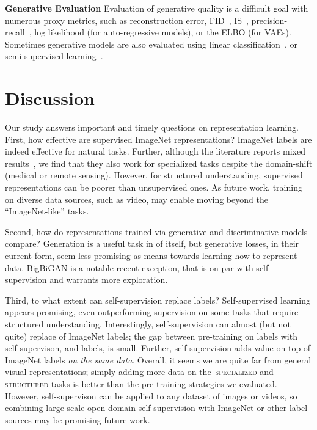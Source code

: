 \documentclass{article}
\newcommand{\myparagraph}[1]{\noindent\textbf{#1}\quad}
\DeclareRobustCommand{\taskSpecialized}{\raisebox{0.5pt}{\tikz{\fill[specialized] (0,0) circle (.5ex);}}\,\textsc{specialized}}
\DeclareRobustCommand{\taskStructured}{\raisebox{0.5pt}{\tikz{\fill[structured] (0,0) circle (.5ex);}}\,\textsc{structured}}
\newcommand{\imagenet}{ImageNet}
\begin{document}
\myparagraph{Generative Evaluation}
Evaluation of generative quality is a difficult goal with numerous proxy metrics, such as reconstruction error, FID~\citep{heusel2017gans}, IS~\citep{salimans2016improved}, precision-recall~\citep{sajjadi2018assessing}, log likelihood (for auto-regressive models), or the ELBO (for VAEs).
Sometimes generative models are also evaluated using linear classification~\citep{radford2016,donahue2016adversarial,dumoulin2016adversarially}, or semi-supervised learning~\citep{kingma2014semi, narayanaswamy2017learning,tschannen2018recent}.


\section{Discussion}
Our study answers important and timely questions on representation learning.
First, how effective are supervised \imagenet{} representations?
\imagenet{} labels are indeed effective for natural tasks.
Further, although the literature reports mixed results~\citep{liu2017detecting,raghu2019,neumann2019domain}, we find that they also work for specialized tasks despite the domain-shift (medical or remote sensing).
However, for structured understanding, supervised representations can be poorer than unsupervised ones.
As future work, training on diverse data sources, such as video, may enable moving beyond the ``\imagenet{}-like'' tasks.

Second, how do representations trained via generative and discriminative models compare?
Generation is a useful task in of itself, but generative losses, in their current form, seem less promising as means towards learning how to represent data.
BigBiGAN is a notable recent exception, that is on par with self-supervision and warrants more exploration.

Third, to what extent can self-supervision replace labels?
Self-supervised learning appears promising, even outperforming supervision on some tasks that require structured understanding.
Interestingly, self-supervision can almost (but not quite) replace  of \imagenet{} labels; the gap between pre-training on  labels with self-supervison, and  labels, is small.
Further, self-supervision adds value on top of \imagenet{} labels \emph{on the same data}.
Overall, it seems we are quite far from general visual representations;
simply adding more data on the \taskSpecialized{} and \taskStructured{} tasks is better than the pre-training strategies we evaluated.
However, self-supervison can be applied to any dataset of images or videos, so combining large scale open-domain self-supervision with \imagenet{} or other label sources may be promising future work.
\end{document}
